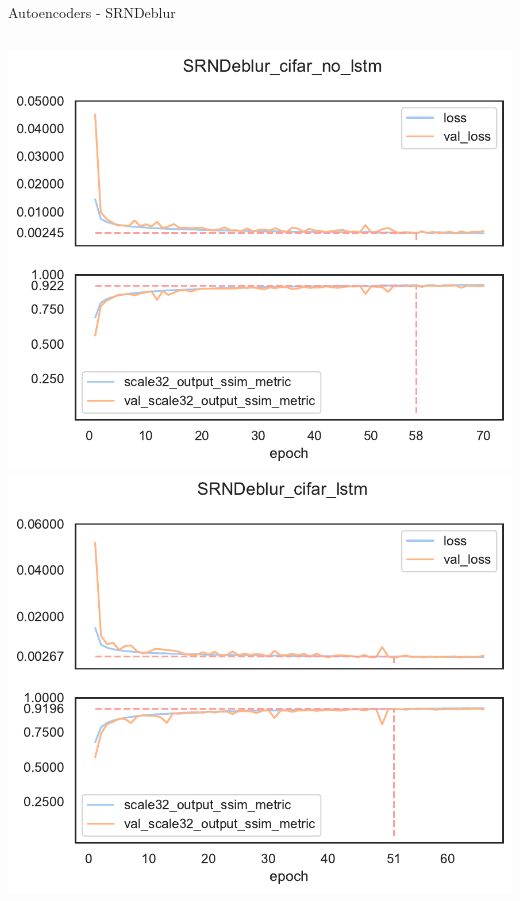\documentclass{beamer}
\begin{document}
\begin{frame}{Autoencoders - SRNDeblur\cite{SRN-DeblurNet}}
{\begin{columns}
\begin{column}[c]{0.35\paperwidth}
                \includegraphics[height=0.3\paperheight,keepaspectratio]{srndeblur/plot_history_SRNDeblur_cifar_no_lstm.pdf}
                \includegraphics[width=0.3\paperheight,keepaspectratio]{srndeblur/plot_history_SRNDeblur_cifar_lstm.pdf}

\end{column}
\end{columns}}
\end{frame}
\end{document}
